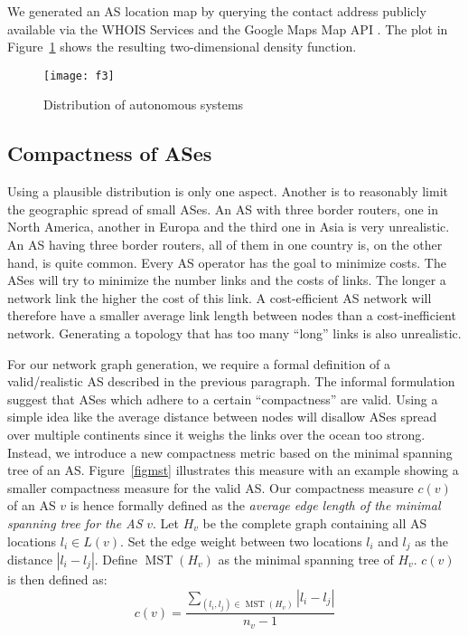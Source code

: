\documentclass{sig-alternate-10pt}
\begin{document}
\begin{enumerate}
We generated an AS location map by querying the contact address publicly available via the WHOIS Services \cite{whoisripe,whoisarin,whoisafrinic,whoisapnic} and the Google Maps Map API \cite{mapsapi}. The plot in Figure~\ref{realasdist} shows the resulting two-dimensional density function. 














\begin{figure}
\texttt{[image: f3]}
\caption{Distribution of autonomous systems}
\label{realasdist}
\end{figure}

\subsection{Compactness of ASes}
\label{sec:compactness-ases}
Using a plausible distribution is only one aspect. Another is to reasonably limit the geographic spread of small ASes. An AS with three border routers, one in North America, another in Europa and the third one in Asia is very unrealistic. An AS having three border routers, all of them in one country is, on the other hand,  is quite common. Every AS operator has the goal to minimize costs. The ASes will try to minimize the number links and the costs of links. The longer a network link the higher the cost of this link. 
A cost-efficient AS network will therefore have a smaller average link length between nodes than a cost-inefficient network. Generating a topology that has too many ``long'' links is also unrealistic.

For our network graph generation, we require a formal definition of a valid/realistic AS described in the previous paragraph. The informal formulation suggest that ASes which adhere to a  certain ``compactness'' are valid. 
Using a simple idea like the average distance between nodes will disallow ASes spread over multiple continents since it weighs the links over the ocean too strong. Instead,  we introduce a new compactness metric based on the minimal spanning tree of an AS. Figure~\ref{figmst} illustrates this measure with an example showing a smaller compactness measure for the valid AS.  
Our compactness measure $c(v)$ of an AS $v$ is hence formally defined as the\emph{ average edge length of the minimal spanning tree for the AS} $v$. Let $H_v$ be the complete graph containing all AS locations  $l_i \in L(v)$. Set the edge weight between two locations $l_i$ and $l_j$ as the distance $|l_i - l_j|$. Define $\operatorname{MST}(H_v)$ as the minimal spanning tree of $H_v$. $c(v)$ is then defined as:
\[ c(v) = \frac{\sum_{(l_i,l_j) \in \operatorname{MST} (H_v)} |l_i - l_j|}{n_v -1 }\]


\end{enumerate}
\end{document}
